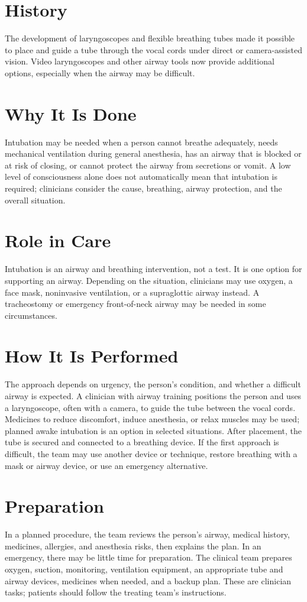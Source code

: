 \section*{History}
The development of laryngoscopes and flexible breathing tubes made it possible to place and guide a tube through the vocal cords under direct or camera-assisted vision. Video laryngoscopes and other airway tools now provide additional options, especially when the airway may be difficult.

\section*{Why It Is Done}
Intubation may be needed when a person cannot breathe adequately, needs mechanical ventilation during general anesthesia, has an airway that is blocked or at risk of closing, or cannot protect the airway from secretions or vomit. A low level of consciousness alone does not automatically mean that intubation is required; clinicians consider the cause, breathing, airway protection, and the overall situation.

\section*{Role in Care}
Intubation is an airway and breathing intervention, not a test. It is one option for supporting an airway. Depending on the situation, clinicians may use oxygen, a face mask, noninvasive ventilation, or a supraglottic airway instead. A tracheostomy or emergency front-of-neck airway may be needed in some circumstances.

\section*{How It Is Performed}
The approach depends on urgency, the person's condition, and whether a difficult airway is expected. A clinician with airway training positions the person and uses a laryngoscope, often with a camera, to guide the tube between the vocal cords. Medicines to reduce discomfort, induce anesthesia, or relax muscles may be used; planned awake intubation is an option in selected situations. After placement, the tube is secured and connected to a breathing device. If the first approach is difficult, the team may use another device or technique, restore breathing with a mask or airway device, or use an emergency alternative.

\section*{Preparation}
In a planned procedure, the team reviews the person's airway, medical history, medicines, allergies, and anesthesia risks, then explains the plan. In an emergency, there may be little time for preparation. The clinical team prepares oxygen, suction, monitoring, ventilation equipment, an appropriate tube and airway devices, medicines when needed, and a backup plan. These are clinician tasks; patients should follow the treating team's instructions.

